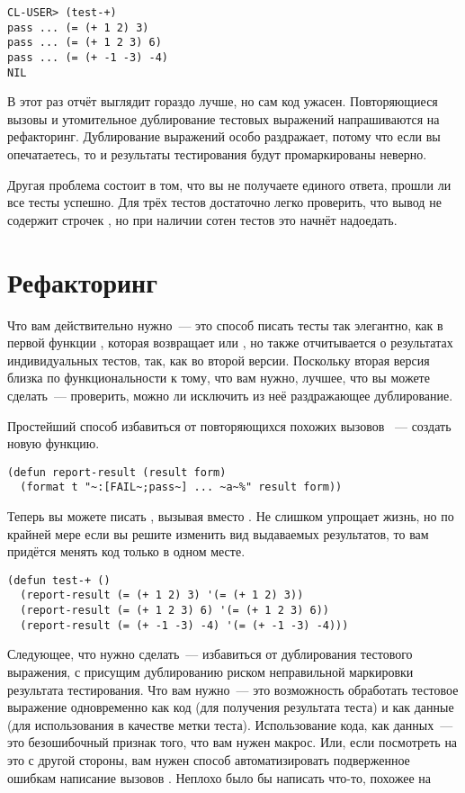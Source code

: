 \begin{lstlisting}
CL-USER> (test-+)
pass ... (= (+ 1 2) 3)
pass ... (= (+ 1 2 3) 6)
pass ... (= (+ -1 -3) -4)
NIL
\end{lstlisting}

В этот раз отчёт выглядит гораздо лучше, но сам код ужасен. Повторяющиеся вызовы
 и утомительное дублирование тестовых выражений напрашиваются на
рефакторинг. Дублирование выражений особо раздражает, потому что если вы опечатаетесь, то
и результаты тестирования будут промаркированы неверно.

Другая проблема состоит в том, что вы не получаете единого ответа, прошли ли все
тесты успешно. Для трёх тестов достаточно легко проверить, что вывод не содержит
строчек , но при наличии сотен тестов это начнёт надоедать.

\section{Рефакторинг}

Что вам действительно нужно~--- это способ писать тесты так элегантно, как в первой
функции , которая возвращает  или , но также отчитывается о
результатах индивидуальных тестов, так, как во второй версии. Поскольку вторая версия
близка по функциональности к тому, что вам нужно, лучшее, что вы можете сделать~---
проверить, можно ли исключить из неё раздражающее дублирование.

Простейший способ избавиться от повторяющихся похожих вызовов ~--- создать
новую функцию.

\begin{lstlisting}
(defun report-result (result form)
  (format t "~:[FAIL~;pass~] ... ~a~%" result form))
\end{lstlisting}

Теперь вы можете писать , вызывая  вместо
. Не слишком упрощает жизнь, но по крайней мере если вы решите изменить вид
выдаваемых результатов, то вам придётся менять код только в одном месте.

\begin{lstlisting}
(defun test-+ ()
  (report-result (= (+ 1 2) 3) '(= (+ 1 2) 3))
  (report-result (= (+ 1 2 3) 6) '(= (+ 1 2 3) 6))
  (report-result (= (+ -1 -3) -4) '(= (+ -1 -3) -4)))
\end{lstlisting}

Следующее, что нужно сделать~--- избавиться от дублирования тестового выражения, с
присущим дублированию риском неправильной маркировки результата тестирования. Что вам
нужно~--- это возможность обработать тестовое выражение одновременно как код (для
получения результата теста) и как данные (для использования в качестве метки
теста). Использование кода, как данных~--- это безошибочный признак того, что вам нужен
макрос. Или, если посмотреть на это с другой стороны, вам нужен способ автоматизировать
подверженное ошибкам написание вызовов . Неплохо было бы написать
что-то, похожее на

